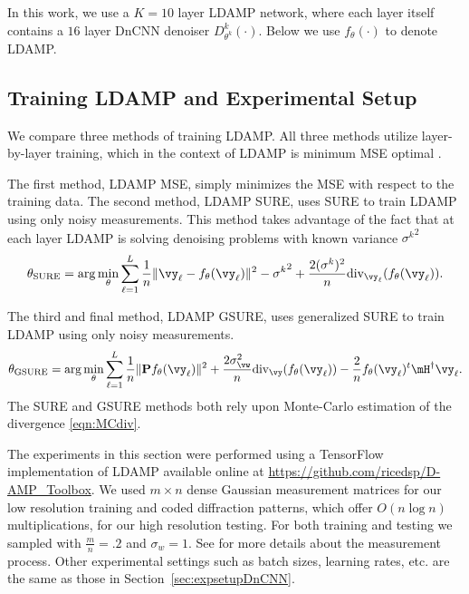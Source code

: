 \documentclass{article}
\begin{document}
In this work, we use a $K=10$ layer LDAMP network, where each layer itself contains a $16$ layer DnCNN denoiser $D^k_{\theta^k}(\cdot)$. %
Below we use $f_\theta(\cdot)$ to denote LDAMP.

\subsection{Training LDAMP and Experimental Setup}%
We compare three methods of training LDAMP. All three methods utilize layer-by-layer training, which in the context of LDAMP is minimum MSE optimal \cite{LDAMP}. 


The first method, LDAMP MSE, simply minimizes the MSE with respect to the training data.
The second method, LDAMP SURE, uses SURE to train LDAMP using only noisy measurements. 
This method takes advantage of the fact that at each layer LDAMP is solving denoising problems with known variance ${{\sigma}^k}^2$\[
\theta_{\text{SURE}}=\arg\min_\theta \sum_{\ell=1}^L  \frac{1}{n}\|\vy_\ell-f_\theta (\vy_\ell)\|^2-{{\sigma}^k}^2+\frac{2{({\sigma}^k})^2}{n}\text{div}_{\vy_\ell}(f_\theta (\vy_\ell)).
\]

The third and final method, LDAMP GSURE, uses generalized SURE to train LDAMP using only noisy measurements.  
\[
\theta_{\text{GSURE}}=\arg\min_\theta \sum_{\ell=1}^L  \frac{1}{n}\|\mathbf{P}f_\theta(\vy_\ell)\|^2+\frac{2\sigma_\vw^2}{n}\text{div}_\vy(f_\theta (\vy_\ell))
-\frac{2}{n}f_\theta (\vy_\ell)^t\mH^\dagger \vy_\ell.
\]%
The SURE and GSURE methods both rely upon Monte-Carlo estimation of the divergence \eqref{eqn:MCdiv}.

The experiments in this section were performed using a TensorFlow implementation of LDAMP available online at \url{https://github.com/ricedsp/D-AMP_Toolbox}. We used $m\times n$ dense Gaussian measurement matrices for our low resolution training and coded diffraction patterns, which offer $O(n\log n)$ multiplications, for our high resolution testing. For both training and testing we sampled with $\frac{m}{n}=.2$ and $\sigma_w=1$. See \cite{LDAMP} for more details about the measurement process. Other experimental settings such as batch sizes, learning rates, etc. are the same as those in Section~\ref{sec:expsetupDnCNN}.
\end{document}
